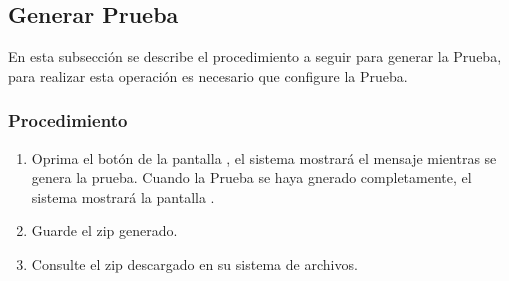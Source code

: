 \subsection{Generar Prueba}
En esta subsección se describe el procedimiento a seguir para generar la Prueba, para realizar esta operación es necesario que configure la Prueba.

\subsubsection{Procedimiento}
\begin{enumerate}
	\item Oprima el botón \btnGenerarPrueba de la pantalla , el sistema mostrará el mensaje  mientras se genera la prueba. 
	      Cuando la Prueba se haya gnerado completamente, el sistema mostrará la pantalla .

	
	
	\item Guarde el zip generado.
	
	\item Consulte el zip descargado en su sistema de archivos.
\end{enumerate}


